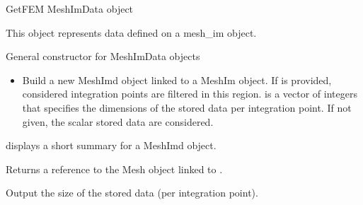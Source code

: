 \documentclass[a4paper,11pt,english]{sphinxmanual}
\begin{document}
\begin{fulllineitems}
\label{\detokenize{python/cmdref_MeshImData:getfem.MeshImData}}
GetFEM MeshImData object

This object represents data defined on a mesh\_im object.

General constructor for MeshImData objects
\begin{itemize}
\item {} 
Build a new MeshImd object linked to a MeshIm object. If  is
provided, considered integration points are filtered in this region.
 is a vector of integers that specifies the dimensions of the
stored data per integration point. If not given, the scalar stored
data are considered.

\end{itemize}

\begin{fulllineitems}
\label{\detokenize{python/cmdref_MeshImData:getfem.MeshImData.display}}
displays a short summary for a MeshImd object.

\end{fulllineitems}


\begin{fulllineitems}
\label{\detokenize{python/cmdref_MeshImData:getfem.MeshImData.linked_mesh}}
Returns a reference to the Mesh object linked to .

\end{fulllineitems}


\begin{fulllineitems}
\label{\detokenize{python/cmdref_MeshImData:getfem.MeshImData.nb_tensor_elements}}
Output the size of the stored data (per integration point).


\end{fulllineitems}
\end{fulllineitems}
\end{document}
